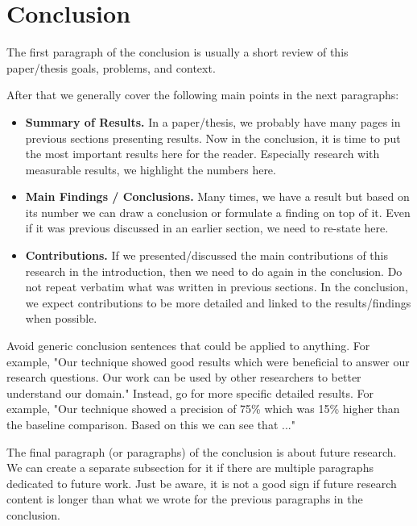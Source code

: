 
\chapter{Conclusion}\label{ch:conclusion}


The first paragraph of the conclusion is usually a short review of this paper/thesis goals, problems, and context. 

After that we generally cover the following main points in the next paragraphs:

\begin{itemize}
\item \textbf{Summary of Results.} 
   In a paper/thesis, we probably have many pages in previous sections presenting results. 
   Now in the conclusion, it is time to put the most important results here for the reader. 
   Especially research with measurable results, we highlight the numbers here. 
\item \textbf{Main Findings / Conclusions.} 
   Many times, we have a result but based on its number we can draw a conclusion or formulate a finding on top of it. 
   Even if it was previous discussed in an earlier section, we need to re-state here. 
\item \textbf{Contributions.} 
   If we presented/discussed the main contributions of this research in the introduction, then we need to do again in the conclusion.
   Do not repeat verbatim what was written in previous sections. 
   In the conclusion, we expect contributions to be more detailed and linked to the results/findings when possible.
\end{itemize}

Avoid generic conclusion sentences that could be applied to anything. 
For example, "Our technique showed good results which were beneficial to answer our research questions. 
Our work can be used by other researchers to better understand our domain."
Instead, go for more specific detailed results.
For example, "Our technique showed a precision of 75\% which was 15\% higher than the baseline comparison. 
Based on this we can see that ..."

The final paragraph (or paragraphs) of the conclusion is about future research. 
We can create a separate subsection for it if there are multiple paragraphs dedicated to future work. 
Just be aware, it is not a good sign if future research content is longer than what we wrote for the previous paragraphs in the conclusion.
